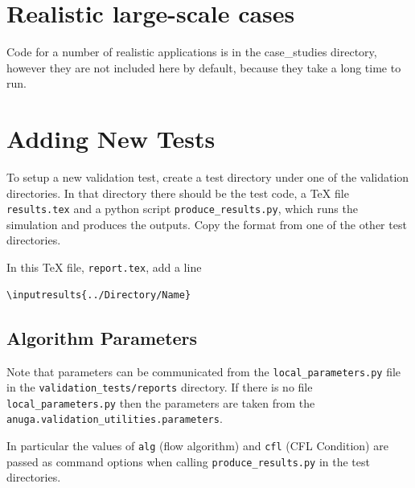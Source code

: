 \documentclass[11pt,a4paper]{report}
\begin{document}


\chapter{Realistic large-scale cases} \label{ch:casestudy}
Code for a number of realistic applications is in the case\_studies directory,
however they are not included here by default, because they take a long time to
run.

\appendix
\chapter{Adding New Tests}


To setup a new validation test, create a test directory under one of
the validation directories. In that directory there should be the test code, a
\TeX{} file \texttt{results.tex} and a python script
\texttt{produce\_results.py}, which runs the simulation and produces the
outputs. Copy the format from one of the other test directories.

In this \TeX{} file, \texttt{report.tex}, add a line
\begin{verbatim}
\inputresults{../Directory/Name}
\end{verbatim}



\section{Algorithm Parameters}
Note that parameters can be communicated from the \verb|local_parameters.py|
file in the \verb|validation_tests/reports| directory. If there is no file
\verb|local_parameters.py| then the parameters are taken from the
\verb|anuga.validation_utilities.parameters|.

In particular the
values of \verb|alg| (flow algorithm) and \verb|cfl| (CFL Condition)
are passed as command options when calling \verb|produce_results.py| in the
test directories.
\end{document}
